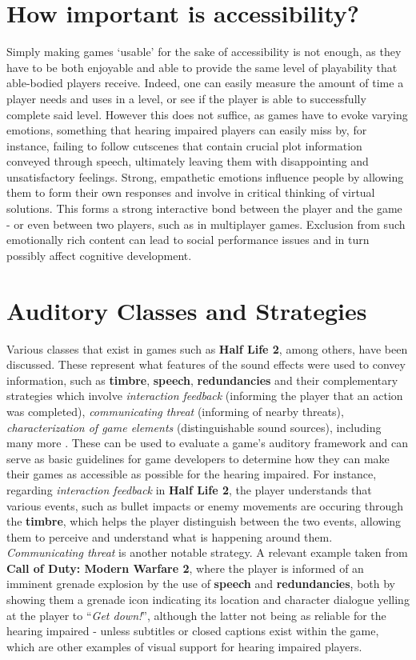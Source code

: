 \documentclass{scrartcl}
\begin{document}
\section{How important is accessibility?}
Simply making games `usable' for the sake of accessibility is not enough, as they have to be both enjoyable and able to provide the same level of playability that able-bodied players receive. Indeed, one can easily measure the amount of time a player needs and uses in a level, or see if the player is able to successfully complete said level. \cite{Arch} However this does not suffice, as games have to evoke varying emotions, something that hearing impaired players can easily miss by, for instance, failing to follow cutscenes that contain crucial plot information conveyed through speech, ultimately leaving them with disappointing and unsatisfactory feelings. Strong, empathetic emotions influence people by allowing them to form their own responses and involve in critical thinking of virtual solutions. This forms a strong interactive bond between the player and the game - or even between two players, such as in multiplayer games. Exclusion from such emotionally rich content can lead to social performance issues and in turn possibly affect cognitive development. \cite{Sebanz} \cite{Chartrand} 

\section{Auditory Classes and Strategies}
Various classes that exist in games such as \textbf{Half Life 2}, among others, have been discussed. These represent what features of the sound effects were used to convey information, such as \textbf{timbre}, \textbf{speech}, \textbf{redundancies} and their complementary strategies which involve \textit{interaction feedback} (informing the player that an action was completed), \textit{communicating threat} (informing of nearby threats), \textit{characterization of game elements} (distinguishable sound sources), including many more \cite{Flav} \cite{Denise}. These can be used to evaluate a game's auditory framework and can serve as basic guidelines for game developers to determine how they can make their games as accessible as possible for the hearing impaired. For instance, regarding \textit{interaction feedback} in \textbf{Half Life 2}, the player understands that various events, such as bullet impacts or enemy movements are occuring through the \textbf{timbre}, which helps the player distinguish between the two events, allowing them to perceive and understand what is happening around them. \textit{Communicating threat} is another notable strategy. A relevant example taken from \textbf{Call of Duty: Modern Warfare 2}, where the player is informed of an imminent grenade explosion by the use of \textbf{speech} and \textbf{redundancies}, both by showing them a grenade icon indicating its location and character dialogue yelling at the player to  ``\textit{Get down!}'', although the latter not being as reliable for the hearing impaired - unless subtitles or closed captions exist within the game, which are other examples of visual support for hearing impaired players. \cite{Denise}
\end{document}
